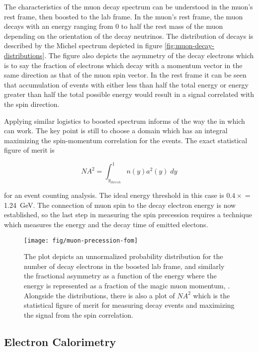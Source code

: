 The characteristics of the muon decay spectrum can be understood in the muon's rest frame, then boosted to the lab frame.  In the muon's rest frame, the muon decays with an energy ranging from 0 to half the rest mass of the muon depending on the orientation of the decay neutrinos.  The distribution of decays is described by the Michel spectrum depicted in figure \ref{fig:muon-decay-distributions}.  The figure also depicts the asymmetry of the decay electrons which is to say the fraction of electrons which decay with a momentum vector in the same direction as that of the muon spin vector.  In the rest frame it can be seen that accumulation of events with either less than half the total energy or energy greater than half the total possible energy would result in a signal correlated with the spin direction.\cite{e821-prd}

Applying similar logistics to boosted spectrum informs of the way the in which \gmtwo can work.  The key point is still to choose a domain which has an integral maximizing the spin-momentum correlation for the events.  The exact statistical figure of merit is 

\begin{equation}
\label{eqn:expt-figure-of-merit}
NA^2 = \int_{y_{thresh}}^{1} n(y) a^2(y) \;dy
\end{equation}

for an event counting analysis.  The ideal energy threshold in this case is $0.4\times$\pmagic$ = $ \SI{1.24}{\GeV}.  The connection of muon spin to the decay electron energy is now established, so the last step in measuring the spin precession requires a technique which measures the energy and the decay time of emitted electons.\cite{e821-prd}

\begin{figure}
\label{fig:muon-precession-fom}
\centering
\texttt{[image: fig/muon-precession-fom]}
\caption{The plot depicts an unnormalized probability distribution for the number of decay electrons in the boosted lab frame, and similarly the fractional asymmetry as a function of the energy where the energy is represented as a fraction of the magic muon momentum, \pmagic. Alongside the distributions, there is also a plot of $NA^2$ which is the statistical figure of merit for measuring decay events and maximizing the signal from the spin correlation.}
\end{figure}

\subsection{Electron Calorimetry}


